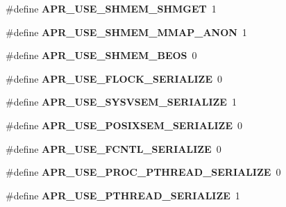\begin{DoxyCompactItemize}
\item 
\#define {\bfseries A\+P\+R\+\_\+\+U\+S\+E\+\_\+\+S\+H\+M\+E\+M\+\_\+\+S\+H\+M\+G\+ET}~1\hypertarget{group__apr__platform_ga04fb6b9c97e668cef00645dd05c45079}{}\label{group__apr__platform_ga04fb6b9c97e668cef00645dd05c45079}

\item 
\#define {\bfseries A\+P\+R\+\_\+\+U\+S\+E\+\_\+\+S\+H\+M\+E\+M\+\_\+\+M\+M\+A\+P\+\_\+\+A\+N\+ON}~1\hypertarget{group__apr__platform_ga7b556f92b8b710978339dc827d2a7a22}{}\label{group__apr__platform_ga7b556f92b8b710978339dc827d2a7a22}

\item 
\#define {\bfseries A\+P\+R\+\_\+\+U\+S\+E\+\_\+\+S\+H\+M\+E\+M\+\_\+\+B\+E\+OS}~0\hypertarget{group__apr__platform_ga964a36a0d15537eb89733bd92e1159cd}{}\label{group__apr__platform_ga964a36a0d15537eb89733bd92e1159cd}

\item 
\#define {\bfseries A\+P\+R\+\_\+\+U\+S\+E\+\_\+\+F\+L\+O\+C\+K\+\_\+\+S\+E\+R\+I\+A\+L\+I\+ZE}~0\hypertarget{group__apr__platform_ga627ab3fb1738314c7e50616e7e4e9370}{}\label{group__apr__platform_ga627ab3fb1738314c7e50616e7e4e9370}

\item 
\#define {\bfseries A\+P\+R\+\_\+\+U\+S\+E\+\_\+\+S\+Y\+S\+V\+S\+E\+M\+\_\+\+S\+E\+R\+I\+A\+L\+I\+ZE}~1\hypertarget{group__apr__platform_ga91ab4154618c08a76cc688ec3f384a27}{}\label{group__apr__platform_ga91ab4154618c08a76cc688ec3f384a27}

\item 
\#define {\bfseries A\+P\+R\+\_\+\+U\+S\+E\+\_\+\+P\+O\+S\+I\+X\+S\+E\+M\+\_\+\+S\+E\+R\+I\+A\+L\+I\+ZE}~0\hypertarget{group__apr__platform_gab41840f9559a2eda0aed18e24911d4fa}{}\label{group__apr__platform_gab41840f9559a2eda0aed18e24911d4fa}

\item 
\#define {\bfseries A\+P\+R\+\_\+\+U\+S\+E\+\_\+\+F\+C\+N\+T\+L\+\_\+\+S\+E\+R\+I\+A\+L\+I\+ZE}~0\hypertarget{group__apr__platform_ga66b87d9b0c7e5b97b8fb21f55a0714d7}{}\label{group__apr__platform_ga66b87d9b0c7e5b97b8fb21f55a0714d7}

\item 
\#define {\bfseries A\+P\+R\+\_\+\+U\+S\+E\+\_\+\+P\+R\+O\+C\+\_\+\+P\+T\+H\+R\+E\+A\+D\+\_\+\+S\+E\+R\+I\+A\+L\+I\+ZE}~0\hypertarget{group__apr__platform_ga2738f508b5926ec10a966d2bdb348452}{}\label{group__apr__platform_ga2738f508b5926ec10a966d2bdb348452}

\item 
\#define {\bfseries A\+P\+R\+\_\+\+U\+S\+E\+\_\+\+P\+T\+H\+R\+E\+A\+D\+\_\+\+S\+E\+R\+I\+A\+L\+I\+ZE}~1\hypertarget{group__apr__platform_ga28fb90a0db4bd6c6f677b269fc743cda}{}\label{group__apr__platform_ga28fb90a0db4bd6c6f677b269fc743cda}


\end{DoxyCompactItemize}
